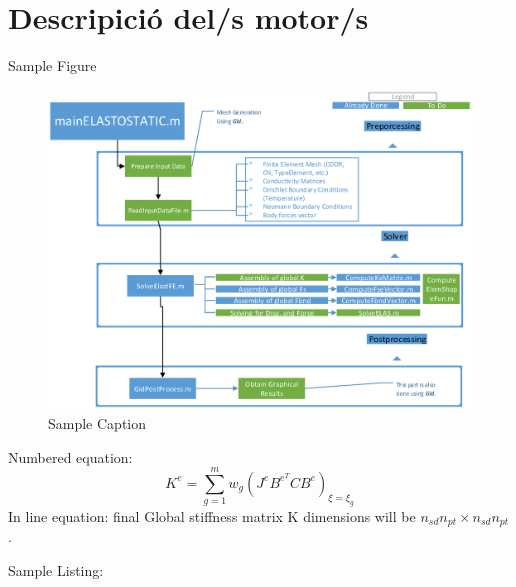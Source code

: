 \section{Descripició del/s motor/s}
Sample Figure
\begin{figure}[H]
	\centering
	\includegraphics[scale=0.9]{./pics/sample}
	\caption{Sample Caption}
\end{figure}
Numbered equation:
\begin{equation}
	K^e = \sum_{g=1}^{m}w_g (J^eB^{e^T}C B^e)_{\xi=\xi_g}
\end{equation}
In line equation:
final Global stiffness matrix K dimensions will be $n_{sd}n_{pt}\times n_{sd}n_{pt}$.

Sample Listing:

